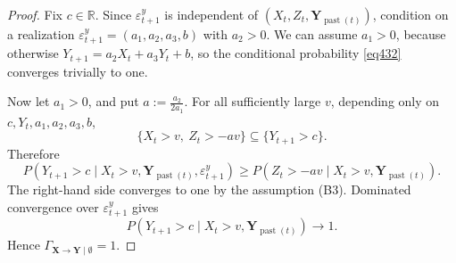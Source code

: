 \documentclass[a4paper,11pt]{article}
\DeclareMathOperator{\past}{past}
\begin{document}
\begin{proof}
Fix \(c\in\mathbb{R}\). Since
\(\varepsilon^y_{t+1}\) is independent of \((X_t,Z_t,\mathbf Y_{\past(t)})\), condition
on a realization \(\varepsilon^y_{t+1}=(a_1,a_2,a_3,b)\) with \(a_2>0\).
We can assume \(a_1>0\), because otherwise \(Y_{t+1}=a_2X_t+a_3Y_t+b\), so the conditional probability \eqref{eq432} converges trivially to one.

Now let \(a_1>0\), and put \(a:=\frac{a_2}{2a_1}\). For all sufficiently large \(v\), depending only on \(c,Y_t,a_1,a_2,a_3,b\),
\[
\{X_t>v,\ Z_t>-av\}
\subseteq
\{Y_{t+1}>c\}.
\]
Therefore
\[
P(Y_{t+1}>c
\mid X_t>v,\mathbf Y_{\past(t)},\varepsilon^y_{t+1})
\ge
P(Z_t>-av\mid X_t>v,\mathbf Y_{\past(t)}).
\]
The right-hand side converges to one by the assumption (B3). Dominated
convergence over \(\varepsilon^y_{t+1}\) gives
\[
P(Y_{t+1}>c\mid X_t>v,\mathbf Y_{\past(t)})\to1 .
\]
Hence \(\Gamma_{\mathbf X\to\mathbf Y\mid\emptyset}=1\).


\end{proof}
\end{document}
